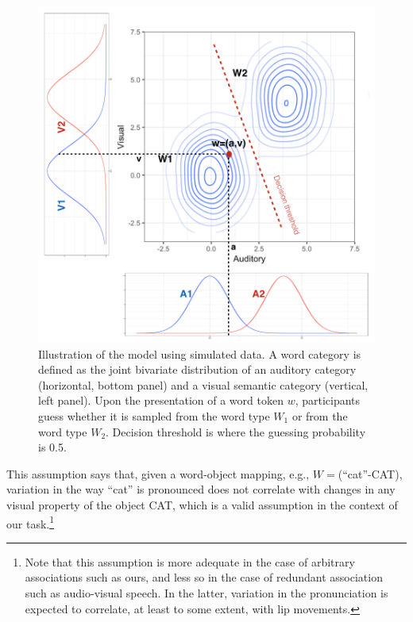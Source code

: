 \documentclass[english,,man,floatsintext]{apa6}
\let\rmarkdownfootnote\footnote%
\def\footnote{\protect\rmarkdownfootnote}
\theoremstyle{definition}
\theoremstyle{definition}
\theoremstyle{definition}
\theoremstyle{remark}
\begin{document}
\begin{figure}[!h]
\includegraphics[width=\textwidth]{pictures/model} \caption{Illustration of the model using simulated data. A word category is defined as the joint bivariate distribution of an auditory category (horizontal, bottom panel) and a visual semantic category (vertical, left panel). Upon the presentation of a word token $w$, participants guess whether it is sampled from the word type $W_1$ or from the word type $W_2$. Decision threshold is where the guessing probability is 0.5.}\label{fig:model}
\end{figure}

\noindent This assumption says that, given a word-object mapping, e.g.,
\(W=\)(\enquote{cat}-CAT), variation in the way \enquote{cat} is
pronounced does not correlate with changes in any visual property of the
object CAT, which is a valid assumption in the context of our
task.\footnote{Note that this assumption is more adequate in the case of arbitrary associations such as ours, and less so in the case of redundant association such as audio-visual speech. In the latter, variation in the pronunciation is expected to correlate, at least to some extent, with lip movements.}
\end{document}
